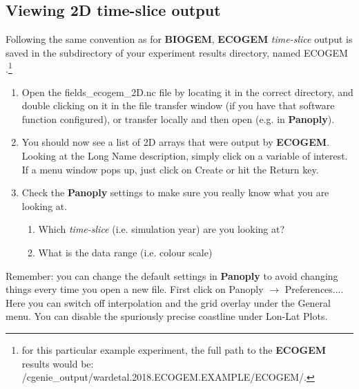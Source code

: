 \documentclass[11pt,fleqn]{book} %
\begin{document}

\subsection{Viewing 2D time-slice output}

Following the same convention as for \textbf{BIOGEM}, \textbf{ECOGEM} \textit{time-slice} output is saved in the subdirectory of your experiment results directory, named \footnotesize\textsf{ECOGEM }\normalsize.\footnote{for this particular example experiment, the full path to the \textbf{ECOGEM} results would be: \\ \scriptsize\textsf{/cgenie\_output/wardetal.2018.ECOGEM.EXAMPLE/ECOGEM/}\normalsize.}

\begin{enumerate}[noitemsep]
\vspace{1mm}
\item Open the \textsf{\small fields\_ecogem\_2D.nc} file by locating it in the correct directory, and double clicking on it in the file transfer window (if you have that software function configured), or transfer locally and then open (e.g. in \textbf{Panoply}).
\vspace{1mm}
\item You should now see a list of 2D arrays that were output by \textbf{ECOGEM}. Looking at the \textsf{\small Long Name} description, simply click on a variable of interest. If a menu window pops up, just click on \textsf{\small Create} or hit the \textsf{\small Return} key.
\vspace{1mm}
\item Check the \textbf{Panoply} settings to make sure you really know what you are looking at.
\begin{enumerate}[noitemsep]
\item Which \textit{time-slice} (i.e. simulation year) are you looking at?
\item What is the data range (i.e. colour scale)
\end{enumerate}
\end{enumerate}
\vspace{2mm}

\noindent Remember: you can change the default settings in \textbf{Panoply} to avoid changing things every time you open a new file. First click on \textsf{\small Panoply} $\rightarrow$ \textsf{\small Preferences...}. Here you can switch off interpolation and the grid overlay under the \textsf{\small General} menu. You can disable the spuriously precise coastline under \textsf{\small Lon-Lat Plots}.
\end{document}
